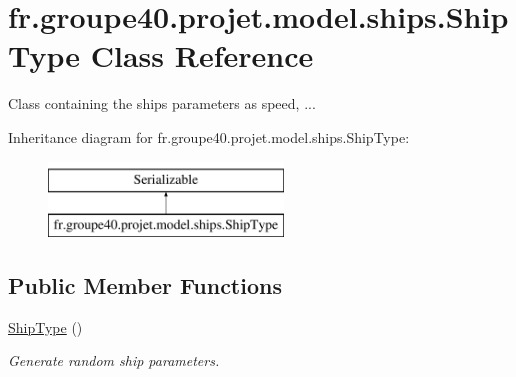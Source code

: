 \hypertarget{classfr_1_1groupe40_1_1projet_1_1model_1_1ships_1_1_ship_type}{}\section{fr.\+groupe40.\+projet.\+model.\+ships.\+Ship\+Type Class Reference}
\label{classfr_1_1groupe40_1_1projet_1_1model_1_1ships_1_1_ship_type}


Class containing the ships parameters as speed, ...  


Inheritance diagram for fr.\+groupe40.\+projet.\+model.\+ships.\+Ship\+Type\+:\begin{figure}[H]
\begin{center}
\leavevmode
\includegraphics[height=2.000000cm]{classfr_1_1groupe40_1_1projet_1_1model_1_1ships_1_1_ship_type}
\end{center}
\end{figure}
\subsection*{Public Member Functions}
\begin{DoxyCompactItemize}
\item 
\mbox{\label{classfr_1_1groupe40_1_1projet_1_1model_1_1ships_1_1_ship_type_a31167b3d069f514871f296fc8b195b93}} 
\hyperlink{classfr_1_1groupe40_1_1projet_1_1model_1_1ships_1_1_ship_type_a31167b3d069f514871f296fc8b195b93}{Ship\+Type} ()
\begin{DoxyCompactList}\small\item\em Generate random ship parameters. \end{DoxyCompactList}\end{DoxyCompactItemize}
